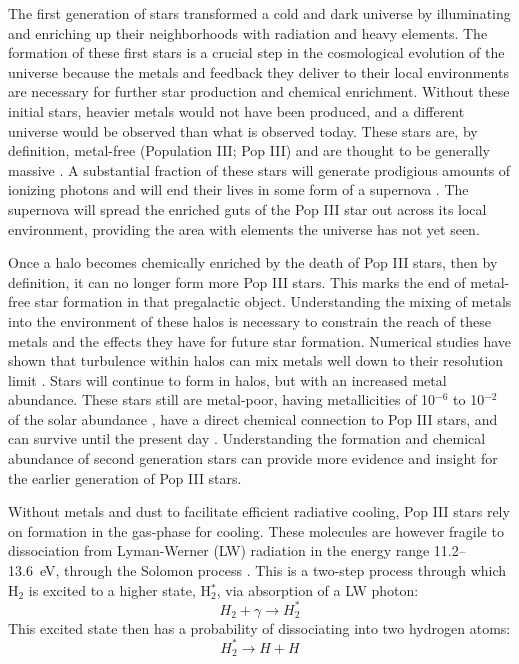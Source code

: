 \documentclass[fleqn,usenatbib]{mnras}
\begin{document}
The first generation of stars transformed a cold and dark universe
by illuminating and enriching up their neighborhoods with radiation
and heavy elements. The formation of these first stars is a crucial step in the cosmological evolution of the universe because the metals and feedback they deliver to their local environments are necessary for further star production and chemical enrichment. Without these initial stars, heavier metals would not have been produced, and a different universe would be observed than what is observed today. These stars are, by definition, metal-free (Population III; Pop III) and are thought to be generally massive \citep{ABN02, Bromm02_P3, Turk09, Hosokawa11, Hosokawa16, Hirano15}. A substantial fraction of these stars will generate prodigious amounts of ionizing photons and will end their lives in some form of a supernova \citep[e.g.][]{Schaerer02, Heger02}. The supernova will spread the enriched guts of the Pop III star out across its local environment, providing the area with elements the universe has not yet seen. 

Once a halo becomes chemically enriched by the death of Pop III stars, then by definition, it can no longer form more Pop III stars. This marks the end of metal-free star formation in that pregalactic object. Understanding the mixing of metals into the environment of these halos is necessary to constrain the reach of these metals and the effects they have for future star formation. Numerical studies have shown that turbulence within halos can mix metals well down to their resolution limit \citep{Wise08_Gal, Greif10, Smith15}. Stars will continue to form in halos, but with an increased metal abundance. These stars still are metal-poor, having metallicities of 10$^{-6}$ to 10$^{-2}$ of the solar abundance \citep{Chiaki16, Chiaki18, Ritter16}, have a direct chemical connection to Pop III stars, and can survive until the present day \citep{Gnedin06, Tumlinson10, Griffen18, Magg18, Ezzeddine19}. Understanding the formation and chemical abundance of second generation stars can provide more evidence and insight for the earlier generation of Pop III stars.

Without metals and dust to facilitate efficient radiative cooling, Pop III stars rely on \hh{} formation in the gas-phase for cooling. These molecules are however fragile to dissociation from Lyman-Werner (LW) radiation in the energy range 11.2--13.6~eV, through the Solomon process \citep{Field66, Stecher67}. This is a two-step process through which H$_{2}$ is excited to a higher state, H$_{2}^{\ast}$, via absorption of a LW photon:
\begin{equation} \label{Solomon1}
	H_{2} + \gamma \rightarrow  H_{2}^{\ast}
\end{equation}
This excited state then has a probability of dissociating into two hydrogen atoms:
\begin{equation} \label{Solomon2}
	H_{2}^{\ast} \rightarrow H + H
\end{equation}
\end{document}
